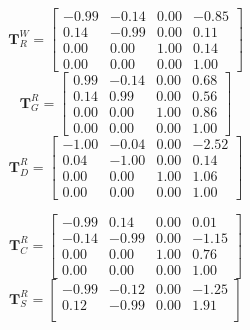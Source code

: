 \documentclass[12pt,a4paper]{article}
\newcommand{\mat}[1]{\mathbf{#1}}
\begin{document}
\begin{tcolorbox}[enhanced,attach boxed title to top center={yshift=-3mm,yshifttext=-1mm}, colback=blue!5!white, colframe=blue!75!black, colbacktitle=blue!40!white, title=Homogeneous transforms for Random Pose 3,fonttitle=\bfseries, boxed title style={size=small,colframe=blue!50!black} ]
    \label{tab:q4_3}
    \begin{minipage}[t]{0.49\linewidth}
    \small
    \[
    \mat{T}^{W}_{R} =
    \begin{bmatrix}
     -0.99 & -0.14 & 0.00 & -0.85 \\
     0.14 & -0.99 & 0.00 & 0.11 \\
     0.00 &  0.00 & 1.00 & 0.14 \\
     0.00 &  0.00 & 0.00 & 1.00
    \end{bmatrix}
    \]
    \vspace{8pt}
    \[
    \mat{T}^{R}_{G} =
    \begin{bmatrix}
     0.99 & -0.14 & 0.00 & 0.68 \\
     0.14 &  0.99 & 0.00 & 0.56 \\
     0.00 &  0.00 & 1.00 & 0.86 \\
     0.00 &  0.00 & 0.00 & 1.00
    \end{bmatrix}
    \]
    \vspace{8pt}
    \[
    \mat{T}^{R}_{D} =
    \begin{bmatrix}
     -1.00 & -0.04 & 0.00 & -2.52 \\
      0.04 & -1.00 & 0.00 &  0.14 \\
      0.00 &  0.00 & 1.00 &  1.06 \\
      0.00 &  0.00 & 0.00 &  1.00
    \end{bmatrix}
    \]
    \end{minipage}\hfill
    \begin{minipage}[t]{0.49\linewidth}
    \small
    \[
    \mat{T}^{R}_{C} =
    \begin{bmatrix}
     -0.99 &  0.14 & 0.00 &  0.01 \\
     -0.14 & -0.99 & 0.00 & -1.15 \\
      0.00 &  0.00 & 1.00 &  0.76 \\
      0.00 &  0.00 & 0.00 &  1.00
    \end{bmatrix}
    \]
    \vspace{8pt}
    \[
    \mat{T}^{R}_{S} =
    \begin{bmatrix}
     -0.99 & -0.12 & 0.00 & -1.25 \\
      0.12 & -0.99 & 0.00 &  1.91 \\

\end{bmatrix}\]
\end{minipage}
\end{tcolorbox}
\end{document}
